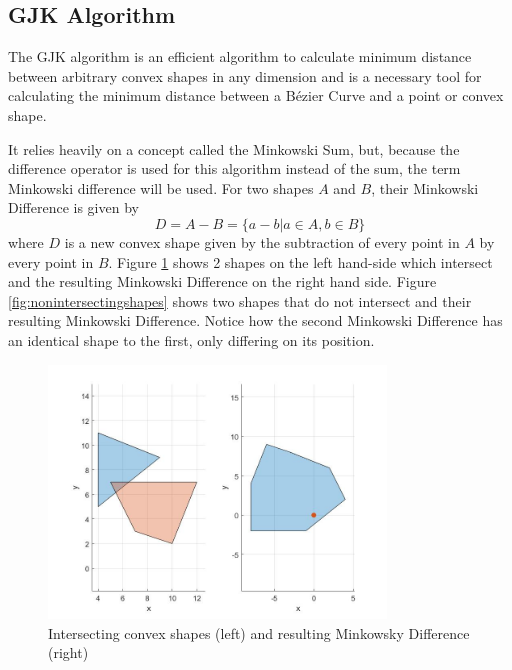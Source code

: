 \subsection{GJK Algorithm}
\label{sec:gjkalg}

\par The \ac{GJK} algorithm \cite{gilbert1988fast} is an efficient algorithm to calculate minimum distance between arbitrary convex shapes in any dimension and is a necessary tool for calculating the minimum distance between a Bézier Curve and a point or convex shape.
\par It relies heavily on a concept called the Minkowski Sum, but, because the difference operator is used for this algorithm instead of the sum, the term Minkowski difference will be used. For two shapes $A$ and $B$, their Minkowski Difference is given by
\begin{equation}
    D = A - B = \{a-b|a\in A, b\in B\}
\end{equation}
where $D$ is a new convex shape given by the subtraction of every point in $A$ by every point in $B$.
Figure \ref{fig:intersectingshapes} shows 2 shapes on the left hand-side which intersect and the resulting Minkowski Difference on the right hand side. Figure \ref{fig:nonintersectingshapes} shows two shapes that do not intersect and their resulting Minkowski Difference. Notice how the second Minkowski Difference has an identical shape to the first, only differing on its position.
\begin{figure}
\centering
\includegraphics[width=0.8\textwidth]{Images/intersectingshapes.jpg}
\caption{Intersecting convex shapes (left) and resulting Minkowsky Difference (right)}
\label{fig:intersectingshapes}
\end{figure}
